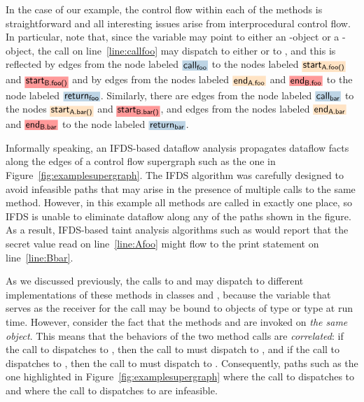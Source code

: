 In the case of our example, the control flow within each of the methods is straightforward and
all interesting issues arise from interprocedural control flow. In particular,
note that, since the variable  may point to either an -object or a -object, 
the call on line~\ref{line:callfoo} may dispatch to either  or to ,
and this is reflected by edges  
  from the node labeled $\highlight{\code{call}_\code{foo}}{greyblue}$ to the nodes labeled
  $\highlight{\code{start}_\code{A.foo()}}{bisque}$ and $\highlight{\code{start}_\code{B.foo()}}{lightsalmonpink}$
and by edges
  from the nodes labeled $\highlight{\code{end}_\code{A.foo}}{bisque}$ and $\highlight{\code{end}_\code{B.foo}}{lightsalmonpink}$ 
  to the node labeled  $\highlight{\code{return}_\code{foo}}{greyblue}$.  
Similarly, there are edges from the node labeled $\highlight{\code{call}_\code{bar}}{greyblue}$ to the nodes 
$\highlight{\code{start}_\code{A.bar()}}{bisque}$ and $\highlight{\code{start}_\code{B.bar()}}{lightsalmonpink}$, and 
edges
  from the nodes labeled $\highlight{\code{end}_\code{A.bar}}{bisque}$ and $\highlight{\code{end}_\code{B.bar}}{lightsalmonpink}$ 
  to the node labeled  $\highlight{\code{return}_\code{bar}}{greyblue}$. 
 
Informally speaking, an IFDS-based dataflow analysis propagates dataflow facts along the edges
of a control flow supergraph such as the one in Figure~\ref{fig:examplesupergraph}. The
IFDS algorithm was carefully designed to avoid infeasible paths that may arise in the
presence of multiple calls to the same method. However, in this example all methods are
called in exactly one place, so IFDS is unable to eliminate dataflow along any of the
paths shown in the figure. As a result, IFDS-based taint analysis algorithms such as
\cite{DBLP:conf/issta/GuarnieriPTDTB11,DBLP:conf/pldi/ArztRFBBKTOM14} would report 
that the secret value read on line~\ref{line:Afoo}
might flow to the print statement on line~\ref{line:Bbar}. 

As we discussed previously, the calls to  and  may dispatch
to different implementations of these methods in classes  and , 
because the variable  that serves as the receiver for the call may be bound to
 objects of type  or type  at run time. 
However, consider the fact that the methods  and  are invoked
on \textit{the same object}. This means that the behaviors of the two method calls
are \textit{correlated}: if the call to  dispatches to ,
then the call to  must dispatch to , and if the call
to  dispatches to , then the call to  must 
dispatch to .  Consequently, paths such as the one highlighted in
Figure~\ref{fig:examplesupergraph} where the call to  dispatches 
to  and where the call to  dispatches to 
are infeasible.  

